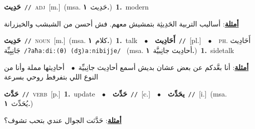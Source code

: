 \documentclass[10pt,a4paper,twoside]{article} %
\begin{document}
\begin{multicols}{2}
{\setlength\topsep{0pt}\textbf{\foreignlanguage{arabic}{حَدِيث}}\ {\color{gray}\texttt{//}\color{black}}\ \textsc{adj}\ [m.]\ \color{gray}(msa. \foreignlanguage{arabic}{حَدِيث}~\foreignlanguage{arabic}{\textbf{١.}})\color{black}\ \textbf{1.}~modern\  \begin{flushright}\color{gray}\foreignlanguage{arabic}{\textbf{\underline{\foreignlanguage{arabic}{أمثلة}}}: أساليب التربية الحَدِيثِة بتمشيش معهم. فش أحسن من الشبشب والخيزرانة}\end{flushright}\color{black}} \vspace{2mm}

{\setlength\topsep{0pt}\textbf{\foreignlanguage{arabic}{حَدِيث}}\ {\color{gray}\texttt{//}\color{black}}\ \textsc{noun}\ [m.]\ \color{gray}(msa. \foreignlanguage{arabic}{كلام}~\foreignlanguage{arabic}{\textbf{١.}})\color{black}\ \textbf{1.}~talk\ \ $\bullet$\ \ \setlength\topsep{0pt}\textbf{\foreignlanguage{arabic}{أَحَادِيث}}\ {\color{gray}\texttt{//}\color{black}}\ [pl.]\ \ $\bullet$\ \ \textsc{ph.} \color{gray} \foreignlanguage{arabic}{أَحَادِيث جَانِبِيِّة}\color{black}\ {\color{gray}\texttt{/{\sffamily ʔaħaːdiː(θ) (dʒ)aːnibijje}/}\color{black}}\ \color{gray} (msa. \foreignlanguage{arabic}{أحادِيث جانِبيَّة}~\foreignlanguage{arabic}{\textbf{١.}})\color{black}\ \textbf{1.}~sidetalk\  \begin{flushright}\color{gray}\foreignlanguage{arabic}{\textbf{\underline{\foreignlanguage{arabic}{أمثلة}}}: أنا بعَّدكم عن بعض عشان بديش أسمع أحادِيث جانِبيِّة\ $\bullet$\ \  أحادِيثها مملة وأنا من النوع اللي بتفرفط روحي بسرعة}\end{flushright}\color{black}} \vspace{2mm}

{\setlength\topsep{0pt}\textbf{\foreignlanguage{arabic}{حَدَّث}}\ {\color{gray}\texttt{//}\color{black}}\ \textsc{verb}\ [p.]\ \textbf{1.}~update\ \ $\bullet$\ \ \setlength\topsep{0pt}\textbf{\foreignlanguage{arabic}{حَدِّث}}\ {\color{gray}\texttt{//}\color{black}}\ [c.]\ \ $\bullet$\ \ \setlength\topsep{0pt}\textbf{\foreignlanguage{arabic}{يحَدِّث}}\ {\color{gray}\texttt{//}\color{black}}\ [i.]\ \color{gray}(msa. \foreignlanguage{arabic}{يُحَدِّث}~\foreignlanguage{arabic}{\textbf{١.}})\color{black}\  \begin{flushright}\color{gray}\foreignlanguage{arabic}{\textbf{\underline{\foreignlanguage{arabic}{أمثلة}}}: حَدَّثت الجوال عندي بتحب تشوف؟}\end{flushright}\color{black}} \vspace{2mm}


\end{multicols}
\end{document}
